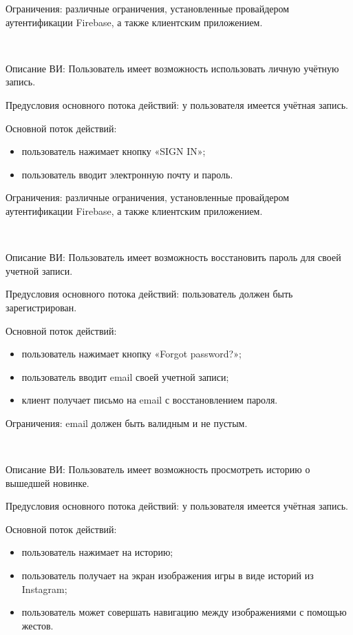 Ограничения: различные ограничения, установленные провайдером аутентификации Firebase, а также клиентским приложением.
 
~\par
Описание ВИ: Пользователь имеет возможность использовать личную учётную запись.
 
Предусловия основного потока действий: у пользователя имеется учётная запись.
 
Основной поток действий:
\begin{itemize}
   \item пользователь нажимает кнопку «SIGN IN»;
   \item пользователь вводит электронную почту и пароль.
\end{itemize}
 
Ограничения: различные ограничения, установленные провайдером аутентификации Firebase, а также клиентским приложением.

~\par
\label{use:resetpassword}
Описание ВИ: Пользователь имеет возможность восстановить пароль для своей учетной записи.
 
Предусловия основного потока действий: пользователь должен быть зарегистрирован.
 
Основной поток действий:
\begin{itemize}
   \item пользователь нажимает кнопку «Forgot password?»;
   \item пользователь вводит email своей учетной записи;
   \item клиент получает письмо на email с восстановлением пароля.
\end{itemize}
 
Ограничения: email должен быть валидным и не пустым.
 
~\par
Описание ВИ: Пользователь имеет возможность просмотреть историю о вышедшей новинке.
 
Предусловия основного потока действий: у пользователя имеется учётная запись.
 
Основной поток действий:
\begin{itemize}
   \item пользователь нажимает на историю;
   \item пользователь получает на экран изображения игры в виде историй из Instagram;
   \item пользователь может совершать навигацию между изображениями с помощью жестов.
\end{itemize}
 
